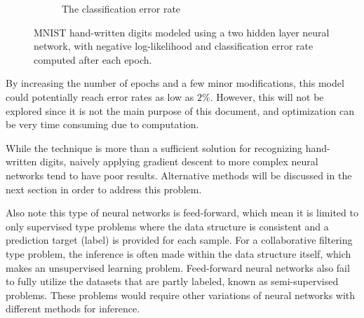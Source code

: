 \begin{figure}[h]
\begin{subfigure}{.45\textwidth}
  \caption{The classification error rate}
  \label{fig:mnist_err}
\end{subfigure}
\caption{MNIST hand-written digits modeled using a two hidden
  layer neural network, with negative log-likelihood and
  classification error rate computed after each epoch.}
\label{fig:mnist_results}
\end{figure}
%
By increasing the number of epochs and a few minor modifications,
this model could potentially reach error rates as low as $2\%$.
However, this will not be explored since it is not
the main purpose of this document,
and optimization can be very time consuming due to computation.


While the technique is more than a sufficient solution 
for recognizing hand-written digits,
naively applying gradient descent to more complex 
neural networks tend to have poor results.
Alternative methods will be discussed in the next section 
in order to address this problem.

Also note this type of neural networks is feed-forward, 
which mean it is limited to only supervised type problems
where the data structure is consistent 
and a prediction target (label) is provided for each sample.
For a collaborative filtering type problem,
the inference is often made within the data structure itself, 
which makes an unsupervised learning problem.
Feed-forward neural networks also fail to fully utilize 
the datasets that are partly labeled, 
known as semi-supervised problems.
These problems would require other variations of neural networks
with different methods for inference.






